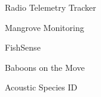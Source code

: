 \item Radio Telemetry Tracker
\item Mangrove Monitoring
\item FishSense
\item Baboons on the Move
\item Acoustic Species ID

